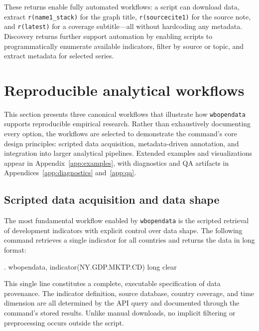 \documentclass[bib]{statapress}
\begin{document}
These returns enable fully automated workflows: a script can download data, extract \texttt{r(name1\_stack)} for the graph title, \texttt{r(sourcecite1)} for the source note, and \texttt{r(latest)} for a coverage subtitle---all without hardcoding any metadata. Discovery returns further support automation by enabling scripts to programmatically enumerate available indicators, filter by source or topic, and extract metadata for selected series.

\section{Reproducible analytical workflows}\label{sec:workflows}

This section presents three canonical workflows that illustrate how
\texttt{wbopendata} supports reproducible empirical research. Rather than
exhaustively documenting every option, the workflows are selected to
demonstrate the command’s core design principles: scripted data acquisition,
metadata-driven annotation, and integration into larger analytical pipelines.
Extended examples and visualizations appear in Appendix~\ref{app:examples},
with diagnostics and QA artifacts in Appendices~\ref{app:diagnostics}
and~\ref{app:qa}.

\subsection{Scripted data acquisition and data shape}\label{sec:workflow-data}

The most fundamental workflow enabled by \texttt{wbopendata} is the scripted
retrieval of development indicators with explicit control over data shape.
The following command retrieves a single indicator for all countries and
returns the data in long format:

\begin{stlog}
. wbopendata, indicator(NY.GDP.MKTP.CD) long clear
\nullskip
\end{stlog}

This single line constitutes a complete, executable specification of data
provenance. The indicator definition, source database, country coverage, and
time dimension are all determined by the API query and documented through the
command’s stored results. Unlike manual downloads, no implicit filtering or
preprocessing occurs outside the script.
\end{document}
